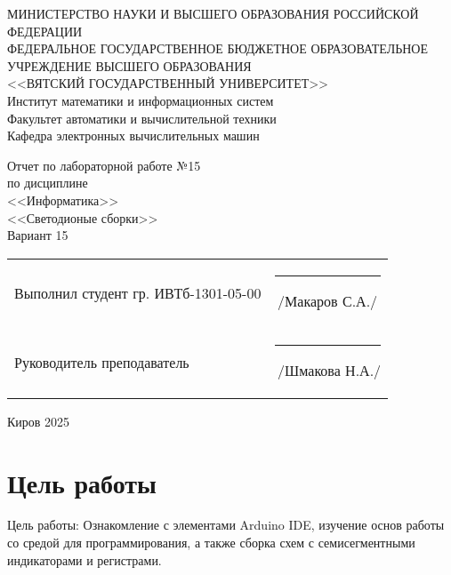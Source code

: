 \documentclass[a4paper,14pt]{extarticle}
\begin{document}
  \newpage\thispagestyle{empty}
  \begin{center}
    \MakeUppercase{
      Министерство науки и высшего образования Российской Федерации\\
      Федеральное государственное бюджетное образовательное учреждение высшего образования\\
      <<Вятский Государственный Университет>>\\
    }
    Институт математики и информационных систем\\
    Факультет автоматики и вычислительной техники\\
    Кафедра электронных вычислительных машин
  \end{center}
  \vfill

  \begin{center}
    Отчет по лабораторной работе №15\\
    по дисциплине\\
    <<Информатика>>\\
    <<Светодионые сборки>>\\
    Вариант 15
  \end{center}
  \vfill

  \noindent
  \begin{tabular}{ll}
    Выполнил студент гр. ИВТб-1301-05-00 \hspace{5mm} & \rule[-1mm]{25mm}{0.10mm}\,/Макаров С.А./ \\
    Руководитель преподаватель & \rule[-1mm]{25mm}{0.10mm}\,/Шмакова Н.А./ \\
  \end{tabular}

  \vfill
  \begin{center}
    Киров 2025
  \end{center}

  \newpage
  \section*{\hspace{12.5mm}Цель работы}
  Цель работы: Ознакомление с элементами Arduino IDE, изучение основ работы со средой для программирования, а также сборка схем с семисегментными индикаторами и регистрами.
\end{document}

